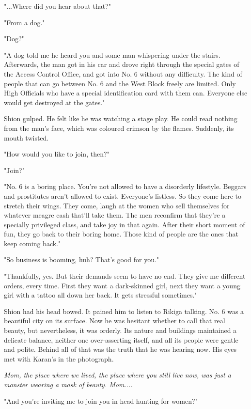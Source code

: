 "...Where did you hear about that?"

"From a dog."

"Dog?"

"A dog told me he heard you and some man whispering under the stairs.
Afterwards, the man got in his car and drove right through the special
gates of the Access Control Office, and got into No. 6 without any
difficulty. The kind of people that can go between No. 6 and the West
Block freely are limited. Only High Officials who have a special
identification card with them can. Everyone else would get destroyed at
the gates."

Shion gulped. He felt like he was watching a stage play. He could read
nothing from the man's face, which was coloured crimson by the flames.
Suddenly, its mouth twisted.

"How would you like to join, then?"

"Join?"

"No. 6 is a boring place. You're not allowed to have a disorderly
lifestyle. Beggars and prostitutes aren't allowed to exist. Everyone's
listless. So they come here to stretch their wings. They come, laugh at
the women who sell themselves for whatever meagre cash that'll take
them. The men reconfirm that they're a specially privileged class, and
take joy in that again. After their short moment of fun, they go back to
their boring home. Those kind of people are the ones that keep coming
back."

"So business is booming, huh? That's good for you."

"Thankfully, yes. But their demands seem to have no end. They give me
different orders, every time. First they want a dark-skinned girl, next
they want a young girl with a tattoo all down her back. It gets
stressful sometimes."

Shion had his head bowed. It pained him to listen to Rikiga talking. No.
6 was a beautiful city on its surface. Now he was hesitant whether to
call that real beauty, but nevertheless, it was orderly. Its nature and
buildings maintained a delicate balance, neither one over-asserting
itself, and all its people were gentle and polite. Behind all of that
was the truth that he was hearing now. His eyes met with Karan's in the
photograph.

\emph{Mom, the place where we lived, the place where you still live now, was
just a monster wearing a mask of beauty. Mom....}

"And you're inviting me to join you in head-hunting for women?"

